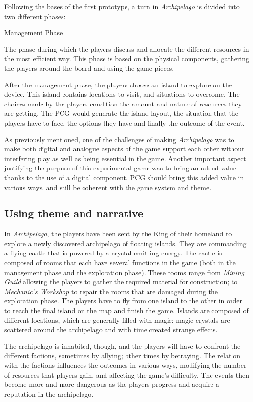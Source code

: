 Following the bases of the first prototype, a turn in \textit{Archipelago} is divided into two different phases:
\begin{labeling}{Management Phase}
\item[\textbf{Management Phase}] The phase during which the players discuss and allocate the different resources in the most efficient way. This phase is based on the physical components, gathering the players around the board and using the game pieces.
\item[\textbf{Exploration Phase}] After the management phase, the players choose an island to explore on the device. This island contains locations to visit, and situations to overcome. The choices made by the players condition the amount and nature of resources they are getting. The PCG would generate the island layout, the situation that the players have to face, the options they have and finally the outcome of the event.
\end{labeling}
As previously mentioned, one of the challenges of making \textit{Archipelago} was to make both digital and analogue aspects of the game support each other without interfering play as well as being essential in the game. Another important aspect justifying the purpose of this experimental game was to bring an added value thanks to the use of a digital component. PCG should bring this added value in various ways, and still be coherent with the game system and theme.
\subsection{Using theme and narrative}
In \textit{Archipelago}, the players have been sent by the King of their homeland to explore a newly discovered archipelago of floating islands. They are commanding a flying castle that is powered by a crystal emitting energy. The castle is composed of rooms that each have several functions in the game (both in the management phase and the exploration phase). These rooms range from \textit{Mining Guild} allowing the players to gather the required material for construction; to \textit{Mechanic's Workshop} to repair the rooms that are damaged during the exploration phase. The players have to fly from one island to the other in order to reach the final island on the map and finish the game. Islands are composed of different locations, which are generally filled with magic: magic crystals are scattered around the archipelago and with time created strange effects.

The archipelago is inhabited, though, and the players will have to confront the different factions, sometimes by  allying; other times by betraying. The relation with the factions influences the outcomes in various ways, modifying the number of resources that players gain, and affecting the game's difficulty. The events then become more and more dangerous as the players progress and acquire a reputation in the archipelago.

